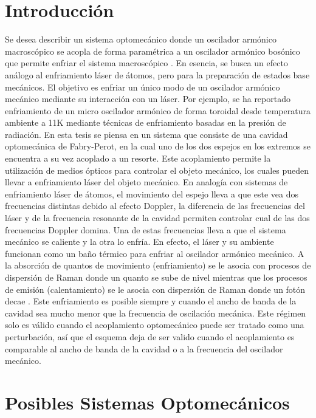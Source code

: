 \documentclass[a4paper,10pt]{report}
\begin{document}
\section{Introducción}

Se desea describir un sistema optomecánico donde un oscilador armónico macroscópico se acopla de forma paramétrica a un oscilador armónico bosónico que permite enfriar el sistema macroscópico \cite{NooshiLC}. En esencia, se busca un efecto análogo al enfriamiento láser de átomos, pero para la preparación de estados base mecánicos. El objetivo es enfriar un único modo de un oscilador armónico mecánico mediante su interacción con un láser. Por ejemplo, se ha reportado enfriamiento de un micro oscilador armónico de forma toroidal desde temperatura ambiente a 11K mediante técnicas de enfriamiento basadas en la presión de radiación\cite{SchliesserRPC}. En esta tesis se piensa en un sistema que consiste de una cavidad optomecánica de Fabry-Perot, en la cual uno de los dos espejos en los extremos se encuentra a su vez acoplado a un resorte. Este acoplamiento permite la utilización de medios ópticos para controlar el objeto mecánico, los cuales pueden llevar a enfriamiento láser del objeto mecánico\cite{NooshiLC}. En analogía con sistemas de enfriamiento láser de átomos, el movimiento del espejo lleva a que este vea dos frecuencias distintas debido al efecto Doppler\cite{KippenberCO}, la diferencia de las frecuencias del láser y de la frecuencia resonante de la cavidad permiten controlar cual de las dos frecuencias Doppler domina. Una de estas frecuencias lleva a que el sistema mecánico se caliente y la otra lo enfría. En efecto, el láser y su ambiente funcionan como un baño térmico para enfriar al oscilador armónico mecánico. A la absorción de quantos de movimiento (enfriamiento) se le asocia con procesos de dispersión de Raman donde un quanto se sube de nivel mientras que los procesos de emisión (calentamiento) se le asocia con dispersión de Raman donde un fotón decae \cite{LCNooshi}. Este enfriamiento es posible siempre y cuando el ancho de banda de la cavidad sea mucho menor que la frecuencia de oscilación mecánica. \cite{LCNooshi} \cite{MarquardtSC} Este régimen solo es válido cuando el acoplamiento optomecánico puede ser tratado como una perturbación, así que el esquema deja de ser valido cuando el acoplamiento es comparable al ancho de banda de la cavidad o a la frecuencia del oscilador mecánico.

\section{Posibles Sistemas Optomecánicos}
\end{document}

